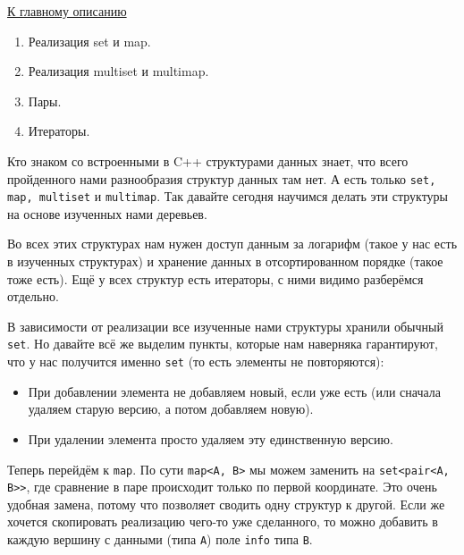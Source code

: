 \label{md2tex12}
\hyperref[md2texREADME]{К главному описанию}


\begin{enumerate}
    \item Реализация set и map.
    \item Реализация multiset и multimap.
    \item Пары.
    \item Итераторы.
\end{enumerate}


Кто знаком со встроенными в C++ структурами данных знает, что всего пройденного нами разнообразия структур данных там нет. А есть только \texttt{set, map, multiset} и \texttt{multimap}. Так давайте сегодня научимся делать эти структуры на основе изученных нами деревьев.

Во всех этих структурах нам нужен доступ данным за логарифм (такое у нас есть в изученных структурах) и хранение данных в отсортированном порядке (такое тоже есть). Ещё у всех структур есть итераторы, с ними видимо разберёмся отдельно.


В зависимости от реализации все изученные нами структуры хранили обычный \texttt{set}. Но давайте всё же выделим пункты, которые нам наверняка гарантируют, что у нас получится именно \texttt{set} (то есть элементы не повторяются):
\begin{itemize}
    \item При добавлении элемента не добавляем новый, если уже есть (или сначала удаляем старую версию, а потом добавляем новую).
    \item При удалении элемента просто удаляем эту единственную версию.
\end{itemize}

Теперь перейдём к \texttt{map}. По сути \texttt{map<A, B>} мы можем заменить на \texttt{set<pair<A, B>>}, где сравнение в паре происходит только по первой координате. Это очень удобная замена, потому что позволяет сводить одну структур к другой. Если же хочется скопировать реализацию чего-то уже сделанного, то можно добавить в каждую вершину с данными (типа \texttt{A}) поле \texttt{info} типа \texttt{B}.



